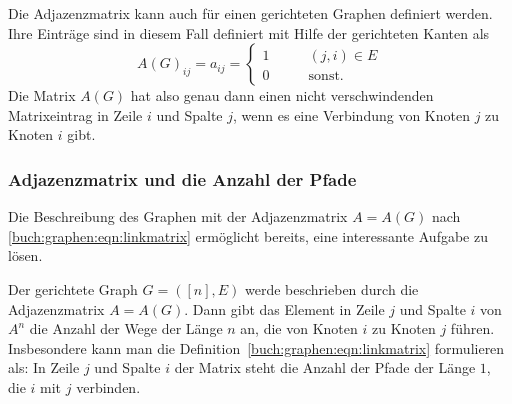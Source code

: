 Die Adjazenzmatrix kann auch für einen gerichteten Graphen definiert
werden.
Ihre Einträge sind in diesem Fall definiert mit Hilfe der 
gerichteten Kanten als
\begin{equation}
A(G)_{ij}
=
a_{ij}
=
\begin{cases}
1&\qquad  (j,i) \in E\\
0&\qquad  \text{sonst.}
\end{cases}
\label{buch:graphen:eqn:linkmatrix}
\end{equation}
Die Matrix $A(G)$ hat also genau dann einen nicht verschwindenden
Matrixeintrag in Zeile $i$ und Spalte $j$, wenn es eine Verbindung
von Knoten $j$ zu Knoten $i$ gibt.


\subsubsection{Adjazenzmatrix und die Anzahl der Pfade}
Die Beschreibung des Graphen mit der Adjazenzmatrix $A=A(G)$ nach
\eqref{buch:graphen:eqn:linkmatrix} ermöglicht bereits, eine interessante
Aufgabe zu lösen.

\begin{satz}
\label{buch:graphen:pfade-der-laenge-n}
Der gerichtete Graph $G=([n],E)$ werde beschrieben durch die Adjazenzmatrix
$A=A(G)$.
Dann gibt das Element in Zeile $j$ und Spalte $i$ von $A^n$ die Anzahl
der Wege der Länge $n$ an, die von Knoten $i$ zu Knoten $j$ führen.
Insbesondere kann man die Definition~\eqref{buch:graphen:eqn:linkmatrix}
formulieren als: In Zeile $j$ und Spalte $i$ der Matrix steht die Anzahl
der Pfade der Länge $1$, die $i$ mit $j$ verbinden.
\end{satz}

